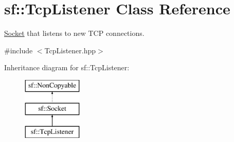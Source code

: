\hypertarget{classsf_1_1TcpListener}{\section{sf\-:\-:Tcp\-Listener Class Reference}
\label{classsf_1_1TcpListener}
}


\hyperlink{classsf_1_1Socket}{Socket} that listens to new T\-C\-P connections.  




{\ttfamily \#include $<$Tcp\-Listener.\-hpp$>$}

Inheritance diagram for sf\-:\-:Tcp\-Listener\-:\begin{figure}[H]
\begin{center}
\leavevmode
\includegraphics[height=3.000000cm]{classsf_1_1TcpListener}
\end{center}
\end{figure}
